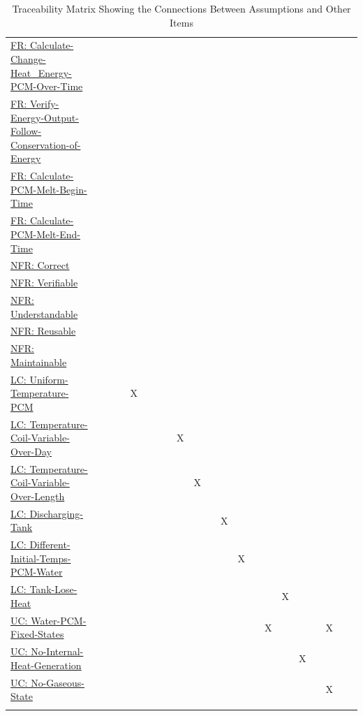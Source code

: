 \documentclass[12pt]{article}
\begin{document}
\begin{longtable}{l l l l l l l l l l l l l l l l l l l l l}
\hyperref[calcChgHeatEnergyPCMOverTime]{FR: Calculate-Change-Heat\_Energy-PCM-Over-Time} &  &  &  &  &  &  &  &  &  &  &  &  &  &  &  &  &  &  &  & 
\\
\hyperref[verifyEnergyOutput]{FR: Verify-Energy-Output-Follow-Conservation-of-Energy} &  &  &  &  &  &  &  &  &  &  &  &  &  &  &  &  &  &  &  & 
\\
\hyperref[calcPCMMeltBegin]{FR: Calculate-PCM-Melt-Begin-Time} &  &  &  &  &  &  &  &  &  &  &  &  &  &  &  &  &  &  &  & 
\\
\hyperref[calcPCMMeltEnd]{FR: Calculate-PCM-Melt-End-Time} &  &  &  &  &  &  &  &  &  &  &  &  &  &  &  &  &  &  &  & 
\\
\hyperref[correct]{NFR: Correct} &  &  &  &  &  &  &  &  &  &  &  &  &  &  &  &  &  &  &  & 
\\
\hyperref[verifiable]{NFR: Verifiable} &  &  &  &  &  &  &  &  &  &  &  &  &  &  &  &  &  &  &  & 
\\
\hyperref[understandable]{NFR: Understandable} &  &  &  &  &  &  &  &  &  &  &  &  &  &  &  &  &  &  &  & 
\\
\hyperref[reusable]{NFR: Reusable} &  &  &  &  &  &  &  &  &  &  &  &  &  &  &  &  &  &  &  & 
\\
\hyperref[maintainable]{NFR: Maintainable} &  &  &  &  &  &  &  &  &  &  &  &  &  &  &  &  &  &  &  & 
\\
\hyperref[likeChgUTP]{LC: Uniform-Temperature-PCM} &  &  &  & X &  &  &  &  &  &  &  &  &  &  &  &  &  &  &  & 
\\
\hyperref[likeChgTCVOD]{LC: Temperature-Coil-Variable-Over-Day} &  &  &  &  &  &  &  & X &  &  &  &  &  &  &  &  &  &  &  & 
\\
\hyperref[likeChgTCVOL]{LC: Temperature-Coil-Variable-Over-Length} &  &  &  &  &  &  &  &  & X &  &  &  &  &  &  &  &  &  &  & 
\\
\hyperref[likeChgDT]{LC: Discharging-Tank} &  &  &  &  &  &  &  &  &  &  & X &  &  &  &  &  &  &  &  & 
\\
\hyperref[likeChgDITPW]{LC: Different-Initial-Temps-PCM-Water} &  &  &  &  &  &  &  &  &  &  &  & X &  &  &  &  &  &  &  & 
\\
\hyperref[likeChgTLH]{LC: Tank-Lose-Heat} &  &  &  &  &  &  &  &  &  &  &  &  &  &  & X &  &  &  &  & 
\\
\hyperref[unlikeChgWPFS]{UC: Water-PCM-Fixed-States} &  &  &  &  &  &  &  &  &  &  &  &  &  & X &  &  &  & X &  & 
\\
\hyperref[unlikeChgNIHG]{UC: No-Internal-Heat-Generation} &  &  &  &  &  &  &  &  &  &  &  &  &  &  &  & X &  &  &  & 
\\
\hyperref[unlikeChgNGS]{UC: No-Gaseous-State} &  &  &  &  &  &  &  &  &  &  &  &  &  &  &  &  &  & X &  & 
\\
\bottomrule
\caption{Traceability Matrix Showing the Connections Between Assumptions and Other Items}
\label{Table:TraceMatAvsAll}
\end{longtable}
\end{document}

